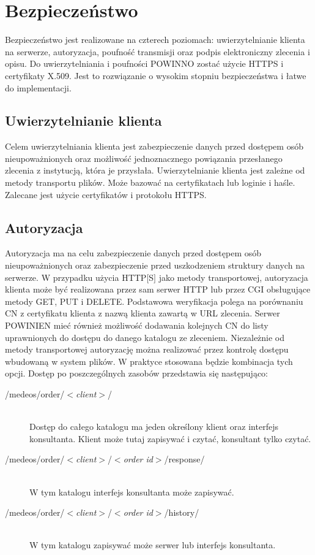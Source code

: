 \documentclass[a4paper]{article}
\begin{document}
\section{Bezpieczeństwo}
\label{sec:bezp}

Bezpieczeństwo jest realizowane na czterech poziomach: uwierzytelnianie klienta na
serwerze, autoryzacja, poufność transmisji oraz podpis elektroniczny
zlecenia i opisu. Do uwierzytelniania i poufności POWINNO zostać użycie HTTPS i certyfikaty
X.509. Jest to rozwiązanie o wysokim stopniu bezpieczeństwa i łatwe do implementacji.

\subsection{Uwierzytelnianie klienta} 

Celem uwierzytelniania klienta jest zabezpieczenie danych przed dostępem osób
nieupoważnionych oraz możliwość jednoznacznego powiązania przesłanego zlecenia z
instytucją, która je przysłała. Uwierzytelnianie klienta jest zależne od metody transportu
plików. Może bazować na certyfikatach lub loginie i haśle. Zalecane jest użycie
certyfikatów i protokołu HTTPS.

\subsection{Autoryzacja}

Autoryzacja ma na celu zabezpieczenie danych przed dostępem osób nieupoważnionych oraz
zabezpieczenie przed uszkodzeniem struktury danych na serwerze. W przypadku użycia
HTTP$[$S$]$ jako metody transportowej, autoryzacja klienta może być realizowana przez sam
serwer HTTP lub przez CGI obsługujące metody GET, PUT i DELETE. Podstawowa weryfikacja
polega na porównaniu CN z certyfikatu klienta z nazwą klienta zawartą w URL zlecenia.
Serwer POWINIEN mieć również możliwość dodawania kolejnych CN do listy uprawnionych do
dostępu do danego katalogu ze zleceniem. Niezależnie od metody transportowej autoryzację
można realizować przez kontrolę dostępu wbudowaną w system plików. W praktyce stosowana
będzie kombinacja tych opcji. Dostęp po poszczególnych zasobów przedstawia się następująco:
\begin{description}
  \item[/medeos/order/$<$\textit{client}$>$/]\hfill\\
  Dostęp do całego katalogu ma jeden określony klient oraz interfejs konsultanta. Klient
  może tutaj zapisywać i czytać, konsultant tylko czytać.
  \item[/medeos/order/$<$\textit{client}$>$/$<$\textit{order id}$>$/response/]\hfill\\ 
  W tym katalogu interfejs konsultanta może zapisywać.
  \item[/medeos/order/$<$\textit{client}$>$/$<$\textit{order id}$>$/history/]\hfill\\ 
  W tym katalogu zapisywać może serwer lub interfejs konsultanta.
\end{description}
\end{document}
